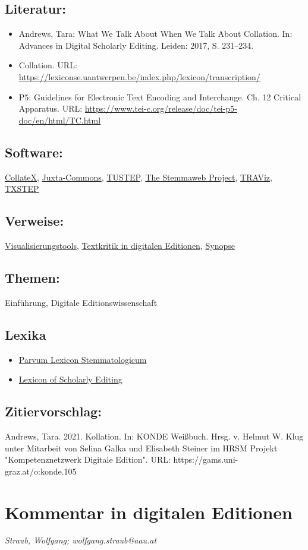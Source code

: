 \documentclass{article}
\begin{document}
        \subsection*{Literatur:}\begin{itemize}\item Andrews, Tara: What We Talk About When We Talk About Collation. In: Advances in Digital Scholarly Editing. Leiden: 2017, S. 231–234.\item Collation. URL: \url{https://lexiconse.uantwerpen.be/index.php/lexicon/transcription/}\item P5: Guidelines for Electronic Text Encoding and
                              Interchange. Ch. 12 Critical Apparatus. URL: \url{https://www.tei-c.org/release/doc/tei-p5-doc/en/html/TC.html}\end{itemize}\subsection*{Software:}\href{https://collatex.net}{CollateX}, \href{http://juxtacommons.org}{Juxta-Commons}, \href{http://www.tustep.uni-tuebingen.de/}{TUSTEP}, \href{https://stemmaweb.net/}{The Stemmaweb
                           Project}, \href{http://www.traviz.vizcovery.org}{TRAViz}, \href{http://www.txstep.de}{TXSTEP}\subsection*{Verweise:}\href{https://gams.uni-graz.at/o:konde.210}{Visualisierungstools}, \href{https://gams.uni-graz.at/o:konde.192}{Textkritik in digitalen
                           Editionen}, \href{https://gams.uni-graz.at/o:konde.174}{Synopse}\subsection*{Themen:}Einführung, Digitale Editionswissenschaft\subsection*{Lexika}\begin{itemize}\item \href{https://wiki.helsinki.fi/display/stemmatology/Collation}{Parvum Lexicon Stemmatologicum}\item \href{https://lexiconse.uantwerpen.be/index.php/lexicon/collation/}{Lexicon of Scholarly Editing}\end{itemize}\subsection*{Zitiervorschlag:}Andrews, Tara. 2021. Kollation. In: KONDE Weißbuch. Hrsg. v. Helmut W. Klug unter Mitarbeit von Selina Galka und Elisabeth Steiner im HRSM Projekt "Kompetenznetzwerk Digitale Edition". URL: https://gams.uni-graz.at/o:konde.105\newpage\section*{Kommentar in digitalen Editionen} \emph{Straub, Wolfgang; wolfgang.straub@aau.at }\\
        
\end{document}
